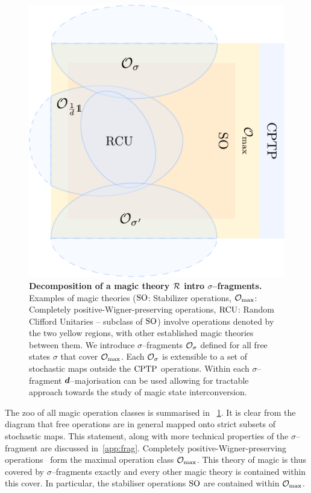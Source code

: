 \documentclass[pra,
aps,
twocolumn,
superscriptaddress,
groupedaddress,
nofootinbib,
reprint
]{revtex4-1}
\begin{document}
\begin{figure}[t]
    \centering
        \includegraphics[scale=0.3
        ]{figs/operations.pdf}
    \caption{\textbf{Decomposition of a magic theory $\mathcal{R}$ intro $\sigma$--fragments.} 
	Examples of magic theories (${\rm{SO}}$: Stabilizer operations, $\mathcal{O}_{\rm{max}}$: Completely positive-Wigner-preserving operations, ${\rm{RCU}}$: Random Clifford Unitaries -- subclass of ${\rm{SO}}$) involve operations denoted by the two yellow regions, with other established magic theories  between them.
    We introduce $\sigma$--fragments $\mathcal{O}_\sigma$ defined for all free states $\sigma$ that cover $\mathcal{O}_{\rm{max}}$. 
    Each $\mathcal{O}_\sigma$ is extensible to a set of stochastic maps outside the ${\rm{CPTP}}$ operations.
    Within each $\sigma$--fragment $\bm{d}$--majorisation can be used allowing for tractable approach towards the study of magic state interconversion.
    }
    \label{fig:zoo}
\end{figure}

The zoo of all magic operation classes is summarised in ~\cref{fig:zoo}.
It is clear from the diagram that free operations are in general mapped onto strict subsets of stochastic maps.
This statement, along with more technical properties of the $\sigma$--fragment are discussed in~\cref{app:frag}.
Completely positive-Wigner-preserving operations~\cite{Wang_2019} form the maximal operation class $\mathcal{O}_{\rm{max}}$.
This theory of magic is thus covered by $\sigma$--fragments exactly and every other magic theory is contained within this cover.
In particular, the stabiliser operations ${\rm{SO}}$ are contained within $\mathcal{O}_{\rm{max}}$.
\end{document}
